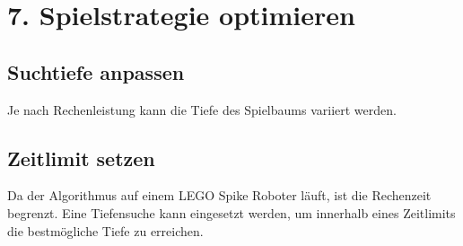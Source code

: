 \section*{7. Spielstrategie optimieren}

\subsection*{Suchtiefe anpassen}
Je nach Rechenleistung kann die Tiefe des Spielbaums variiert werden. 

\subsection*{Zeitlimit setzen}
Da der Algorithmus auf einem LEGO Spike Roboter läuft, ist die Rechenzeit begrenzt. Eine Tiefensuche kann eingesetzt werden, um innerhalb eines Zeitlimits die bestmögliche Tiefe zu erreichen.